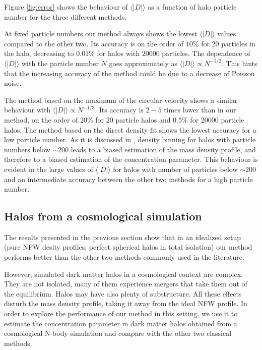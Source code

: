 \documentclass[a4,useAMS,usenatbib,usegraphicx]{mn2e}
\newcommand{\avg}[1]{\langle{#1}\rangle}
\begin{document}
Figure \ref{fig:error} shows the behaviour of $\avg{|D|}$ as a function of
halo particle number for the three different methods.

At fixed particle numbers our method always shows the lowest
$\avg{|D|}$ values compared to the other two.
Its accuracy is on the order of $10\%$ for $20$ particles in the halo,
decreasing to $0.01\%$ for halos with $20000$ particles.  
The dependence of $\avg{|D|}$ with the particle number $N$
goes approximately as $\avg{|D|}\propto N^{-1/2}$.   
This hints that the increasing accuracy of the method could be due to
a decrease of Poisson noise. 

The method based on the maximum of the circular velocity shows a
similar behaviour with $\avg{|D|}\propto N^{-1/3}$.  
Its accuracy is $2-5$ times lower than in our method, on the order of
$20\%$ for $20$ particle halos and $0.5\%$ for $20000$ particle
halos. 
The method  based on the direct density fit shows the lowest accuracy for a low
  particle number. 
  As it is discussed in \citep{Munoz2011}, density binning for halos
  with particle numbers below $\sim200$ leads to a biased estimation
  of the mass density profile, and therefore to a biased estimation of
  the concentration parameter. 
This behaviour is evident in the large values of $\avg{|D|}$ for halos
with number of particles below $\sim 200$ and an intermediate accuracy
between the other two methods for a high particle number. 

\subsection{Halos from a cosmological simulation}

The results presented in the previous section show that in an
idealized setup (pure NFW desity profiles, perfect spherical halos in
total isolation) our method performs better than the other two
methods commonly used in the literature.

However, simulated dark matter halos in a cosmological context are
complex. 
They are not isolated, many of them  experience mergers that take them
out of the equilibrium. 
Halos may have also plenty of substructure. All these effects
disturb the mass density profile, taking it  away from the ideal NFW
profile. 
In order to explore the performance of our method in this setting, we
use it to estimate the  concentration parameter in dark matter halos
obtained from a cosmological N-body simulation and compare with the
other two classical methods.   
 
\end{document}
